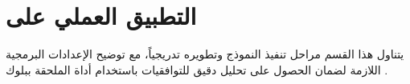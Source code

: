 
\section{التطبيق العملي على } \label{sec:sec4}
  \thispagestyle{empty} %
  {\fontsize{16}{28}\selectfont
  يتناول هذا القسم مراحل تنفيذ النموذج وتطويره تدريجياً، مع توضيح الإعدادات البرمجية اللازمة لضمان الحصول على تحليل دقيق للتوافقيات باستخدام أداة  الملحقة ببلوك .
  \par}

  



